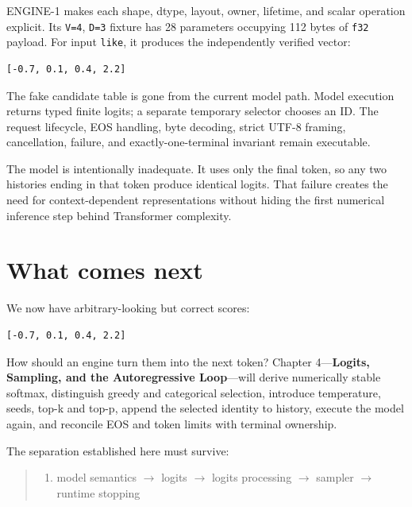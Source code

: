 ENGINE-1 makes each shape, dtype, layout, owner, lifetime, and scalar
operation explicit. Its \texttt{V=4}, \texttt{D=3} fixture has 28
parameters occupying 112 bytes of \texttt{f32} payload. For input
\texttt{like}, it produces the independently verified vector:

\begin{verbatim}
[-0.7, 0.1, 0.4, 2.2]
\end{verbatim}

The fake candidate table is gone from the current model path. Model
execution returns typed finite logits; a separate temporary selector
chooses an ID. The request lifecycle, EOS handling, byte decoding,
strict UTF-8 framing, cancellation, failure, and exactly-one-terminal
invariant remain executable.

The model is intentionally inadequate. It uses only the final token, so
any two histories ending in that token produce identical logits. That
failure creates the need for context-dependent representations without
hiding the first numerical inference step behind Transformer complexity.

\section{What comes next}\label{what-comes-next}

We now have arbitrary-looking but correct scores:

\begin{verbatim}
[-0.7, 0.1, 0.4, 2.2]
\end{verbatim}

How should an engine turn them into the next token? Chapter
4---\textbf{Logits, Sampling, and the Autoregressive Loop}---will derive
numerically stable softmax, distinguish greedy and categorical
selection, introduce temperature, seeds, top-k and top-p, append the
selected identity to history, execute the model again, and reconcile EOS
and token limits with terminal ownership.

The separation established here must survive:

\begin{quote}
\begin{enumerate}
\item model semantics  \(\longrightarrow\)  logits  \(\longrightarrow\)  logits processing  \(\longrightarrow\)  sampler  \(\longrightarrow\)  runtime stopping
\end{enumerate}
\end{quote}

